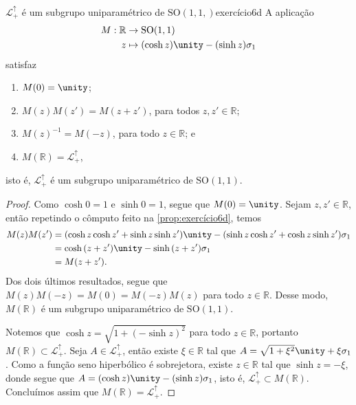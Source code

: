 \begin{proposition}{\(\mathcal{L}_+^\uparrow\) é um subgrupo uniparamétrico de \(\mathrm{SO}(1,1,)\)}{exercício6d}
    A aplicação
    \begin{align*}
        M : \mathbb{R} &\to \mathrm{SO}(1,1)\\
                     z &\mapsto (\cosh{z})\unity - (\sinh{z})\sigma_1
    \end{align*}
    satisfaz
    \begin{enumerate}[label=(\alph*)]
        \item \(M(0) = \unity\);
        \item \(M(z)M(z') = M(z + z')\), para todos \(z, z' \in \mathbb{R}\);
        \item \(M(z)^{-1} = M(-z)\), para todo \(z \in \mathbb{R}\); e
        \item \(M(\mathbb{R}) = \mathcal{L}_+^\uparrow\),
    \end{enumerate}
    isto é, \(\mathcal{L}_+^\uparrow\) é um subgrupo uniparamétrico de \(\mathrm{SO}(1,1)\).
\end{proposition}
\begin{proof}
     Como \(\cosh{0} = 1\) e \(\sinh{0} = 1\), segue que \(M(0) = \unity\). Sejam \(z, z' \in \mathbb{R}\), então repetindo o cômputo feito na \cref{prop:exercício6d}, temos
    \begin{align*}
        M(z) M(z') &= (\cosh{z}\cosh{z'} + \sinh{z}\sinh{z'}) \unity - (\sinh{z}\cosh{z'} + \cosh{z}\sinh{z'})\sigma_1\\
                   &= \cosh{(z+z')} \unity - \sinh{(z+ z')}\sigma_1\\
                   &= M(z + z').
    \end{align*}
    Dos dois últimos resultados, segue que \(M(z)M(-z) = M(0) = M(-z)M(z)\) para todo \(z \in \mathbb{R}\). Desse modo, \(M(\mathbb{R})\) é um subgrupo uniparamétrico de \(\mathrm{SO}(1,1)\).

    Notemos que \(\cosh{z} = \sqrt{1 + (-\sinh{z})^2}\) para todo \(z \in \mathbb{R}\), portanto \(M(\mathbb{R}) \subset \mathcal{L}_+^\uparrow\). Seja \(A \in \mathcal{L}_+^\uparrow\), então existe \(\xi \in \mathbb{R}\) tal que \(A = \sqrt{1 + \xi^2}\unity + \xi \sigma_1\). Como a função seno hiperbólico é sobrejetora, existe \(z \in \mathbb{R}\) tal que \(\sinh{z} = -\xi\), donde segue que \(A = (\cosh{z})\unity - (\sinh{z})\sigma_1\), isto é, \(\mathcal{L}_+^\uparrow \subset M(\mathbb{R})\). Concluímos assim que \(M(\mathbb{R}) = \mathcal{L}_+^\uparrow\).
\end{proof}

